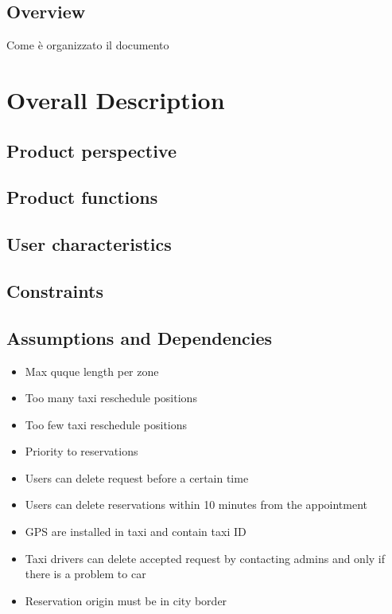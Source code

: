 \documentclass{article}
\begin{document}
	
	\subsection{Overview}
	    Come è organizzato il documento
	
	
\section{Overall Description}
	\subsection{Product perspective}
	
	\subsection{Product functions}
	
	\subsection{User characteristics}
	
	\subsection{Constraints}
	
	\subsection{Assumptions and Dependencies}
	   \begin{itemize}
	        \item Max quque length per zone
	        \item Too many taxi reschedule positions
	        \item Too few taxi reschedule positions
	        \item Priority to reservations
	        \item Users can delete request before a certain time
	        \item Users can delete reservations within 10 minutes from the appointment
	        \item GPS are installed in taxi and contain taxi ID
	        \item Taxi drivers can delete accepted request by contacting admins and only if there is a problem to car 
	        \item Reservation origin must be in city border
	    \end{itemize}
	
\end{document}
